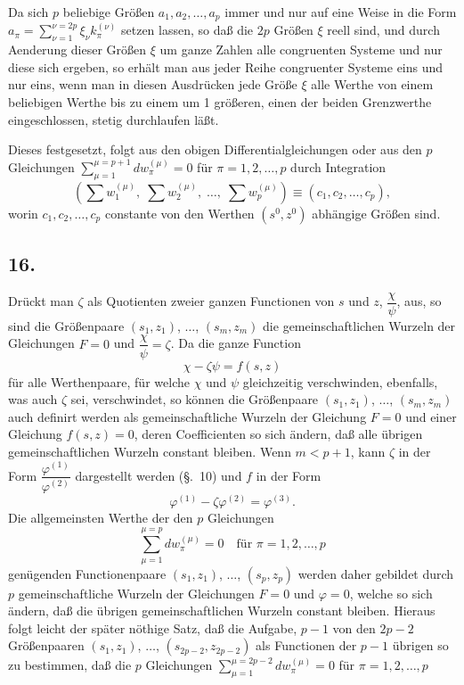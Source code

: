 \documentclass{article}
\begin{document}
Da sich $p$ beliebige Größen $a_{1}, a_{2}, \ldots, a_{p}$ immer und nur auf eine Weise in die Form $a_{\pi} = \displaystyle\sum_{\nu=1}^{\nu=2p} \xi_{\nu} k_{\pi}^{(\nu)}$ setzen lassen, so daß die $2p$ Größen $\xi$ reell sind, und durch Aenderung dieser Größen $\xi$ um ganze Zahlen alle congruenten Systeme und nur diese sich ergeben, so erhält man aus jeder Reihe congruenter Systeme eins und nur eins, wenn man in diesen Ausdrücken jede Größe $\xi$ alle Werthe von einem beliebigen Werthe bis zu einem um 1 größeren, einen der beiden Grenzwerthe eingeschlossen, stetig durchlaufen läßt.

Dieses festgesetzt, folgt aus den obigen Differentialgleichungen oder aus den $p$ Gleichungen $\displaystyle\sum_{\mu=1}^{\mu=p+1} dw_{\pi}^{(\mu)} = 0$ für $\pi = 1, 2, \ldots, p$ durch Integration
\[ \left(\sum w_{1}^{(\mu)}, \; \sum w_{2}^{(\mu)}, \; \ldots, \; \sum w_{p}^{(\mu)}\right) \equiv (c_{1}, c_{2}, \ldots, c_{p}), \]
worin $c_{1}, c_{2}, \ldots, c_{p}$ constante von den Werthen $(s^{0}, z^{0})$ abhängige Größen sind.

\subsection*{16.}

Drückt man $\zeta$ als Quotienten zweier ganzen Functionen von $s$ und $z$, $\dfrac{\chi}{\psi}$, aus, so sind die Größenpaare $(s_{1}, z_{1})$, $\ldots$, $(s_{m}, z_{m})$ die gemeinschaftlichen Wurzeln der Gleichungen $F = 0$ und $\dfrac{\chi}{\psi} = \zeta$. Da die ganze Function
\[ \chi - \zeta\psi = f(s, z) \]
für alle Werthenpaare, für welche $\chi$ und $\psi$ gleichzeitig verschwinden, ebenfalls, was auch $\zeta$ sei, verschwindet, so können die Größenpaare $(s_{1}, z_{1})$, $\ldots$, $(s_{m}, z_{m})$ auch definirt werden als gemeinschaftliche Wurzeln der Gleichung $F = 0$ und einer Gleichung $f(s, z) = 0$, deren Coefficienten so sich ändern, daß alle übrigen gemeinschaftlichen Wurzeln constant bleiben. Wenn $m < p+1$, kann $\zeta$ in der Form $\dfrac{\varphi^{(1)}}{\varphi^{(2)}}$ dargestellt werden (§.~10) und $f$ in der Form
\[ \varphi^{(1)} - \zeta\varphi^{(2)} = \varphi^{(3)}. \]
Die allgemeinsten Werthe der den $p$ Gleichungen
\[ \sum_{\mu=1}^{\mu=p} dw_{\pi}^{(\mu)} = 0 \quad \text{für } \pi = 1, 2, \ldots, p \]
genügenden Functionenpaare $(s_{1}, z_{1})$, $\ldots$, $(s_{p}, z_{p})$ werden daher gebildet durch $p$ gemeinschaftliche Wurzeln der Gleichungen $F = 0$ und $\varphi = 0$, welche so sich ändern, daß die übrigen gemeinschaftlichen Wurzeln constant bleiben. Hieraus folgt leicht der später nöthige Satz, daß die Aufgabe, $p-1$ von den $2p-2$ Größenpaaren $(s_{1}, z_{1})$, $\ldots$, $(s_{2p-2}, z_{2p-2})$ als Functionen der $p-1$ übrigen so zu bestimmen, daß die $p$ Gleichungen $\displaystyle\sum_{\mu=1}^{\mu=2p-2} dw_{\pi}^{(\mu)} = 0$ für $\pi = 1, 2, \ldots, p$
\end{document}
